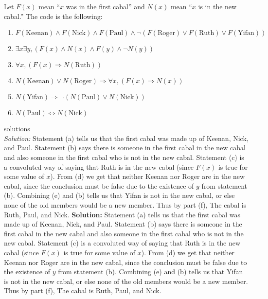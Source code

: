 \documentclass[12pt]{article}
\begin{document}
\begin{enumerate}
Let $F(x)$ mean ``$x$ was in the first cabal'' and $N(x)$ mean ``$x$ is in the new cabal.'' The code is the following:
\begin{enumerate}
\item$F(\text{Keenan})\land F(\text{Nick})\land F(\text{Paul})\land\lnot(F(\text{Roger})\lor F(\text{Ruth})\lor F(\text{Yifan}))$
\item$\exists x\exists y, (F(x)\land N(x)\land F(y)\land \lnot N(y))$
\item $\forall x, (F(x)\Rightarrow N(\text{Ruth}))$
\item $N(\text{Keenan})\lor N(\text{Roger})\Rightarrow \forall x, (F(x)\Rightarrow N(x))$
\item $N(\text{Yifan}) \Rightarrow \lnot (N(\text{Paul})\lor N(\text{Nick}))$
\item $N(\text{Paul})\Leftrightarrow N(\text{Nick})$
\end{enumerate}
\if
solutions
\\\emph{Solution:} Statement (a) tells us that the first cabal was made up of Keenan, Nick, and Paul. Statement (b) says there is someone in the first cabal in the new cabal and also someone in the first cabal who is not in the new cabal. Statement (c) is a convoluted way of saying that Ruth is in the new cabal (since $F(x)$ is true for some value of $x$). From (d) we get that neither Keenan nor Roger are in the new cabal, since the conclusion must be false due to the existence of $y$ from statement (b). Combining (e) and (b) tells us that Yifan is not in the new cabal, or else none of the old members would be a new member. Thus by part (f), The cabal is Ruth, Paul, and Nick. 
\fi
\textbf{Solution: }Statement (a) tells us that the first cabal was made up of Keenan, Nick, and Paul. Statement (b) says there is someone in the first cabal in the new cabal and also someone in the first cabal who is not in the new cabal. Statement (c) is a convoluted way of saying that Ruth is in the new cabal (since $F(x)$ is true for some value of $x$). From (d) we get that neither Keenan nor Roger are in the new cabal, since the conclusion must be false due to the existence of $y$ from statement (b). Combining (e) and (b) tells us that Yifan is not in the new cabal, or else none of the old members would be a new member. Thus by part (f), The cabal is Ruth, Paul, and Nick. 

\end{enumerate}
\end{document}
